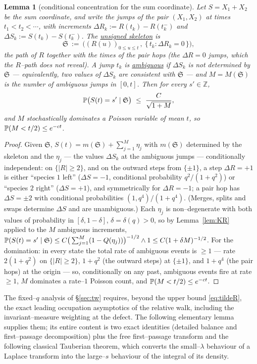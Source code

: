 \documentclass[11pt]{article}
\theoremstyle{plain}
\newtheorem{lemma}[theorem]{Lemma}
\theoremstyle{definition}
\theoremstyle{remark}
\newcommand{\Z}{\mathbb{Z}}\newcommand{\R}{\mathbb{R}}\newcommand{\N}{\mathbb{N}}
\begin{document}
\begin{lemma}[conditional concentration for the sum coordinate]\label{lem:Slclt}
Let $S=X_1+X_2$ be the sum coordinate, and write the jumps of the pair $(X_1,X_2)$ at
times $t_1<t_2<\cdots$, with increments $\Delta R_k:=R(t_k)-R(t_k^-)$ and
$\Delta S_k:=S(t_k)-S(t_k^-)$. The \underline{unsigned skeleton} is
\begin{equation}\label{eq:skeleton}
  \mathfrak S\ :=\ \Big((R(u))_{0\le u\le t}\,,\ \{\,t_k:\Delta R_k=0\,\}\Big),
\end{equation}
the path of $R$ together with the times of the pair hops (the $\Delta R=0$ jumps, which
the $R$--path does not reveal). A jump $t_k$ is \underline{ambiguous} if $\Delta S_k$ is not
determined by $\mathfrak S$ --- equivalently, two values of $\Delta S_k$ are consistent
with $\mathfrak S$ --- and $M=M(\mathfrak S)$ is the number of ambiguous jumps in
$[0,t]$. Then for every $s'\in\Z$,
\[
  \PP\big(S(t)=s'\mid \mathfrak S\big)\ \le\ \frac{C}{\sqrt{1+M}},
\]
and $M$ stochastically dominates a Poisson variable of mean $t$, so
$\mathbb{P}(M<t/2)\le e^{-ct}$.
\end{lemma}
\begin{proof}
Given $\mathfrak S$, $S(t)=m(\mathfrak S)+\sum_{j=1}^M\eta_j$ with $m(\mathfrak S)$
determined by the skeleton and the $\eta_j$ --- the values $\Delta S_k$ at the
ambiguous jumps --- conditionally independent: on
$\{|R|\ge2\}$, and on the outward steps from $\{\pm1\}$, a step $\Delta R=+1$ is
either ``species $1$ left'' ($\Delta S=-1$, conditional probability $q^2/(1+q^2)$) or
``species $2$ right'' ($\Delta S=+1$), and symmetrically for $\Delta R=-1$; a pair
hop has $\Delta S=\pm2$ with conditional probabilities $(1,q^4)/(1+q^4)$. (Merges,
splits and swaps determine $\Delta S$ and are unambiguous.) Each $\eta_j$ is
non--degenerate with both values of probability in $[\delta,1-\delta]$,
$\delta=\delta(q)>0$, so by Lemma~\ref{lem:KR} applied to the $M$ ambiguous increments,
$\mathbb{P}(S(t)=s'\mid\mathfrak S)\le C\big(\sum_{j=1}^M(1-Q(\eta_j))\big)^{-1/2}\wedge1
\le C(1+\delta M)^{-1/2}$. For the domination: in every state the total rate of
ambiguous events is $\ge1$ --- rate $2(1+q^2)$ on $\{|R|\ge2\}$, $1+q^2$ (the outward
steps) at $\{\pm1\}$, and $1+q^4$ (the pair hops) at the origin --- so, conditionally
on any past, ambiguous events fire at rate $\ge1$, $M$ dominates a rate--$1$ Poisson
count, and $\mathbb{P}(M<t/2)\le e^{-ct}$.
\end{proof}

The fixed--$q$ analysis of \S\ref{sec:tw} requires, beyond the upper bound
\eqref{eq:tildeR}, the exact leading occupation asymptotics of the relative walk,
including the invariant--measure weighting at the defect. The following elementary
lemma supplies them; its entire content is two exact identities (detailed balance and
first--passage decomposition) plus the free first--passage transform and the following
classical Tauberian theorem, which converts the small--$\lambda$ behaviour of a Laplace
transform into the large--$s$ behaviour of the integral of its density.
\end{document}
